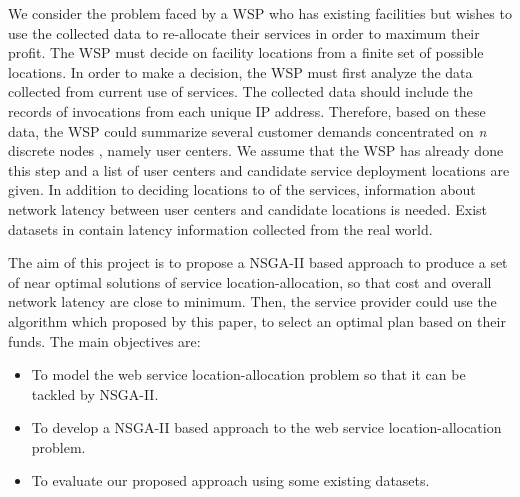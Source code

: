 \documentclass{llncs}
\begin{document}
%
%

We consider the problem faced by a WSP who has existing facilities but wishes to use the collected data to re-allocate their services in order to maximum their profit.
The WSP must decide on facility locations from a finite set of possible locations. 
In order to make a decision, the WSP must first analyze the data collected from current use of services. 
The collected data should include the records of invocations from each unique IP address.
Therefore, based on these data, the WSP could summarize several customer demands concentrated on \textit{n} discrete nodes \cite{Aboolian}, namely user centers. 
We assume that the WSP has already done this step and a list of user centers and candidate service deployment locations are given.
In addition to deciding locations to of the services, information about network latency between user centers and candidate locations is needed. 
Exist datasets in \cite{6076756} \cite{5552800} contain latency information collected from the real world. 

The aim of this project is to propose a NSGA-II based approach to produce a set of near optimal solutions of service location-allocation, so that cost and overall network latency are 
close to minimum. Then, the service provider could use the algorithm which proposed by this paper, to select an optimal plan based on their funds. 
The main objectives are:
\begin{itemize}
	\item To model the web service location-allocation problem so that it can be tackled by NSGA-II.
	\item To develop a NSGA-II based approach to the web service location-allocation problem.
	\item To evaluate our proposed approach using some existing datasets.
\end{itemize}
\end{document}
